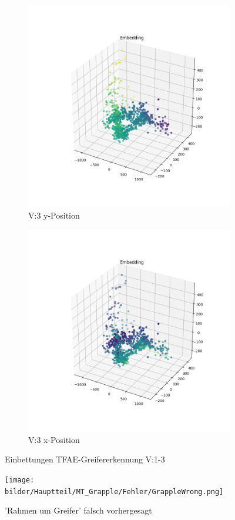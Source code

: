 \begin{figure}[h]
	\begin{subfigure}[c]{0.49\textwidth}			
		\includegraphics[width=1\textwidth,center]{bilder/Hauptteil/MT_Grapple/EMB_alle/3_Embedding_y.png}
		\caption{V:3 y-Position}
		\label{img:Einbettung3_y}	
	\end{subfigure}
	\centering
	\begin{subfigure}[c]{0.49\textwidth}			
		\includegraphics[width=1\textwidth,center]{bilder/Hauptteil/MT_Grapple/EMB_alle/3_Embedding_x.png}
		\caption{V:3 x-Position}
		\label{img:Einbettung3_x}		
	\end{subfigure}
	
	\caption{Einbettungen TFAE-Greifererkennung V:1-3}
	\label{img:Einbettungen1-3}
\end{figure}

	\begin{figure}[h]
		\centering
		\texttt{[image: bilder/Hauptteil/MT\_Grapple/Fehler/GrappleWrong.png]}
		\caption{'Rahmen um Greifer' falsch vorhergesagt}
		\label{img:GrappleFalschVorhergesagt}
	\end{figure}
